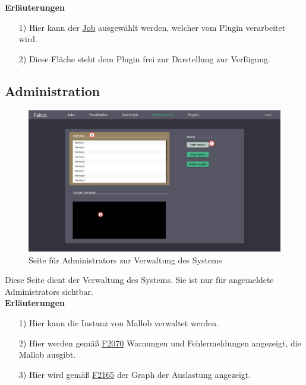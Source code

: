 \textbf{Erläuterungen}
\begin{itemize}
    \item[1)] Hier kann der \hyperref[B:Jobs]{Job} ausgewählt werden, welcher vom \gls{Plugin} verarbeitet wird.
    \item[2)] Diese Fläche steht dem \gls{Plugin} frei zur Darstellung zur Verfügung.
\end{itemize}

\newpage
\subsection{Administration}
\label{pages:admin}
\begin{figure}[H]
    \centering
    \includegraphics[width=\textwidth]{images-interface/v4_interface/admin_page_4.pdf}
    \caption{Seite für \glspl{Administrator} zur Verwaltung des Systems}
    \label{fig:admin-page}
\end{figure}
Diese Seite dient der Verwaltung des Systems. Sie ist nur für angemeldete \glspl{Administrator} sichtbar. \\

\textbf{Erläuterungen}
\begin{itemize}
    \item[1)] Hier kann die Instanz von \gls{Mallob} verwaltet werden.
    \item[2)] Hier werden gemäß \hyperref[FA:Web-Interface:Anzeigen von Warnungen und Fehlermeldungen]{F2070} Warnungen und Fehlermeldungen angezeigt, die \gls{Mallob} ausgibt.
    \item[3)] Hier wird gemäß \hyperref[FA:Web-Interface:Anzeigen von Diagnosedaten]{F2165} der Graph der Auslastung angezeigt.
\end{itemize}

